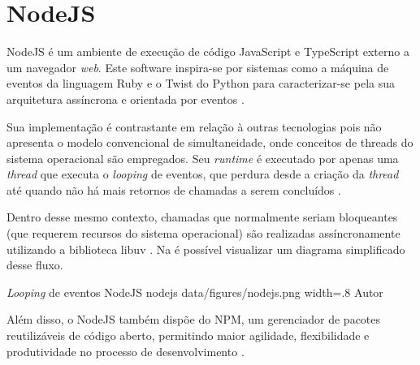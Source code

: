 \section{NodeJS}
\label{sec:nodejs}
NodeJS é um ambiente de execução de código JavaScript e TypeScript externo a um navegador \textit{web}. Este software inspira-se por sistemas como a máquina de eventos da linguagem Ruby e o Twist do Python para caracterizar-se pela sua arquitetura assíncrona e orientada por eventos \cite{Foundation2023}. 

Sua implementação é contrastante em relação à outras tecnologias pois não apresenta o modelo convencional de simultaneidade, onde conceitos de threads do sistema operacional são empregados.  Seu \textit{runtime} é executado por apenas uma \textit{thread} que executa o \textit{looping} de eventos, que perdura desde a criação da \textit{thread} até quando não há mais retornos de chamadas a serem concluídos \cite{Foundation2023}.

Dentro desse mesmo contexto, chamadas que normalmente seriam bloqueantes (que requerem recursos do sistema operacional) são realizadas assíncronamente utilizando a biblioteca libuv \cite{ClaudioWunder}. Na  é possível visualizar um diagrama simplificado desse fluxo.

\image
    {\textit{Looping} de eventos NodeJS}
    {nodejs}
    {data/figures/nodejs.png}
    {width=.8\textwidth}
    {Autor}

Além disso, o NodeJS também dispõe do NPM, um gerenciador de pacotes reutilizáveis de código aberto, permitindo maior agilidade, flexibilidade e produtividade no processo de desenvolvimento \cite{npm2022}.